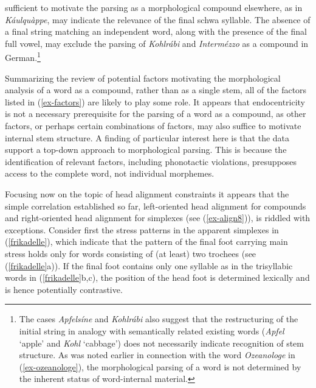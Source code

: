 \documentclass[output=paper
 ,nobabel
 ,draftmode
 ,colorlinks, citecolor=brown
]{langscibook}
\begin{document}
sufficient to motivate the parsing as a morphological compound elsewhere, as in \emph{Káulquàppe},
may indicate the relevance of the final schwa syllable. The absence of a final
string matching an independent word, along with the presence of the final full vowel, may exclude the
parsing of  \emph{Kohlrábi} and \emph{Intermézzo} as a compound in German.\footnote{The cases
  \emph{Apfelsíne} and \emph{Kohlrábi} also suggest that the restructuring of the initial string in
  analogy with semantically related existing words (\eg \emph{Apfel} `apple' and \emph{Kohl}
  `cabbage') does not necessarily indicate recognition of stem structure. As was noted earlier in
  connection with the word \emph{Ozeanologe} in (\ref{ex-ozeanologe}), the morphological parsing of
  a word is not determined by the inherent status of word-internal material.} 

Summarizing the review of potential factors motivating the morphological analysis of a word as a compound, rather than as a single stem, all of the factors listed in (\ref{ex-factors}) are likely to play some role. It appears that endocentricity is not a necessary prerequisite for the parsing of a word as a compound, as other factors, or perhaps certain combinations of factors, may also suffice to motivate internal stem structure. A finding of particular interest here is that the data support a top-down approach to morphological parsing. This is because the identification of relevant factors, including phonotactic violations, presupposes access to the complete word, not individual morphemes. 

Focusing now on the topic of head alignment constraints it appears that the simple correlation
established so far, left-oriented head alignment for compounds and right-oriented head alignment for
simplexes (see (\ref{ex-align8})), is riddled with exceptions. Consider first the stress patterns in the apparent simplexes in (\ref{frikadelle}), which indicate that the pattern of the final foot carrying main stress holds only for words consisting of (at least) two trochees (see (\ref{frikadelle}a)). If the final foot contains only one syllable as in the trisyllabic words in (\ref{frikadelle}b,c), the position of the head foot is determined lexically and is hence potentially contrastive.
\end{document}
